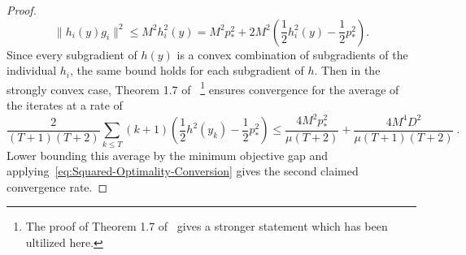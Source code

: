\documentclass[sn-mathphys,Numbered]{sn-jnl}%
\begin{document}
\begin{appendices}
{\begin{proof}
\begin{equation}
    \|h_i(y)g_i\|^2 \leq M^2h_i^2(y) = M^2p_*^2 + 2M^2\left(\frac{1}{2}h^2_i(y) - \frac{1}{2}p_*^2\right). \label{eq:general-subgrad-bound}
\end{equation}
Since every subgradient of $h(y)$ is a convex combination of subgradients of the individual $h_i$, the same bound holds for each subgradient of $h$. Then in the strongly convex case, Theorem 1.7 of~\cite{grimmer2019} \footnote{The proof of Theorem 1.7 of~\cite{grimmer2019} gives a stronger statement which has been ultilized here.} ensures convergence  for the average of the iterates at a rate of
$$ \frac{2}{(T+1)(T+2)}\sum_{k\leq T}(k+1) \left(\frac{1}{2}h^2(y_k) - \frac{1}{2}p^2_*\right) \leq \frac{4M^2p_*^2}{\mu(T+2)} + \frac{4M^4D^2}{\mu(T+1)(T+2)} \ . $$
Lower bounding this average by the minimum objective gap and applying~\eqref{eq:Squared-Optimality-Conversion} gives the second claimed convergence rate.
\end{proof}

}
\end{appendices}
\end{document}
